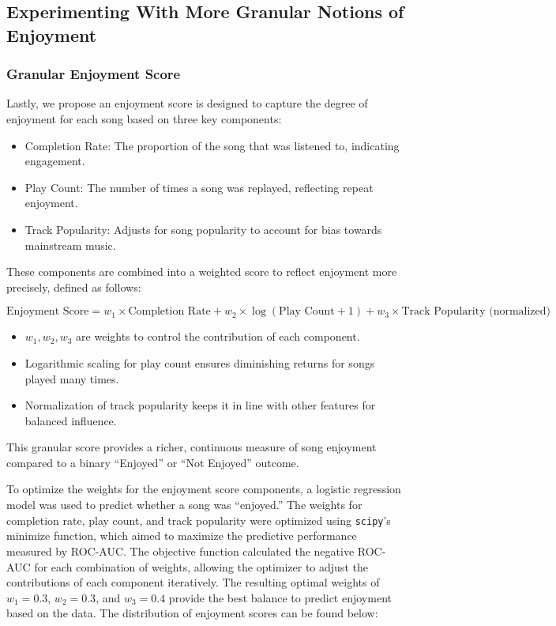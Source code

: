 \documentclass[11pt]{article}
\providecommand{\tightlist}{%
  \setlength{\itemsep}{0pt}\setlength{\parskip}{0pt}}
\begin{document}
    \subsection{Experimenting With More Granular Notions of
Enjoyment}\label{experimenting-with-more-granular-notions-of-enjoyment}

\subsubsection{Granular Enjoyment Score}\label{granular-enjoyment-score}

Lastly, we propose an enjoyment score is designed to capture the degree
of enjoyment for each song based on three key components:

\begin{itemize}
\tightlist
\item
  Completion Rate: The proportion of the song that was listened to,
  indicating engagement.
\item
  Play Count: The number of times a song was replayed, reflecting repeat
  enjoyment.
\item
  Track Popularity: Adjusts for song popularity to account for bias
  towards mainstream music.
\end{itemize}

These components are combined into a weighted score to reflect enjoyment
more precisely, defined as follows:

\[
\text{Enjoyment Score} = w_1 \times \text{Completion Rate} + w_2 \times \log(\text{Play Count} + 1) + w_3 \times \text{Track Popularity (normalized)}
\]

\begin{itemize}
\tightlist
\item
  \(w_1, w_2, w_3\) are weights to control the contribution of each
  component.
\item
  Logarithmic scaling for play count ensures diminishing returns for
  songs played many times.
\item
  Normalization of track popularity keeps it in line with other features
  for balanced influence.
\end{itemize}

This granular score provides a richer, continuous measure of song
enjoyment compared to a binary ``Enjoyed'' or ``Not Enjoyed'' outcome.

    To optimize the weights for the enjoyment score components, a logistic
regression model was used to predict whether a song was ``enjoyed.'' The
weights for completion rate, play count, and track popularity were
optimized using \texttt{scipy}'s minimize function, which aimed to
maximize the predictive performance measured by ROC-AUC. The objective
function calculated the negative ROC-AUC for each combination of
weights, allowing the optimizer to adjust the contributions of each
component iteratively. The resulting optimal weights of \(w_1 = 0.3\),
\(w_2 = 0.3\), and \(w_3 = 0.4\) provide the best balance to predict
enjoyment based on the data. The distribution of enjoyment scores can be
found below:
\end{document}

